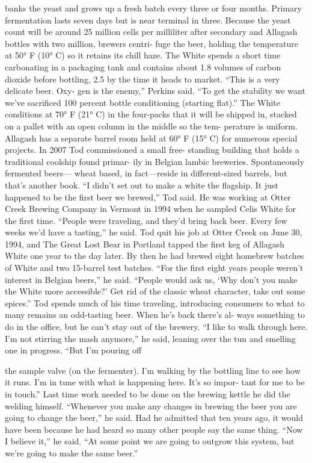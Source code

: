 \documentclass[a4paper,parskip=half]{scrartcl}
\begin{document}
banks the yeast and grows up a fresh batch every three or four months.
Primary fermentation lasts seven days but is near terminal in three.
Because the yeast count will be around 25 million cells per milliliter
after secondary and Allagash bottles with two million, brewers centri-
fuge the beer, holding the temperature at 50° F (10° C) so it retains its
chill haze.
The White spends a short time carbonating in a packaging tank
and contains about 1.8 volumes of carbon dioxide before bottling,
2.5 by the time it heads to market. “This is a very delicate beer. Oxy-
gen is the enemy,” Perkins said. “To get the stability we want we’ve
sacrificed 100 percent bottle conditioning (starting flat).” The White
conditions at 70° F (21° C) in the four-packs that it will be shipped
in, stacked on a pallet with an open column in the middle so the tem-
perature is uniform.
Allagash has a separate barrel room held at 60° F (15° C) for
numerous special projects. In 2007 Tod commissioned a small free-
standing building that holds a traditional coolship found primar-
ily in Belgian lambic breweries. Spontaneously fermented beers—
wheat based, in fact—reside in different-sized barrels, but that’s
another book.
“I didn’t set out to make a white the flagship. It just happened
to be the first beer we brewed,” Tod said. He was working at Otter
Creek Brewing Company in Vermont in 1994 when he sampled Celis
White for the first time. “People were traveling, and they’d bring
back beer. Every few weeks we’d have a tasting,” he said. Tod quit
his job at Otter Creek on June 30, 1994, and The Great Lost Bear in
Portland tapped the first keg of Allagash White one year to the day
later. By then he had brewed eight homebrew batches of White and
two 15-barrel test batches.
“For the first eight years people weren’t interest in Belgian beers,”
he said. “People would ask us, ‘Why don’t you make the White more
accessible?’ Get rid of the classic wheat character, take out some spices.”
Tod spends much of his time traveling, introducing consumers to
what to many remains an odd-tasting beer. When he’s back there’s al-
ways something to do in the office, but he can’t stay out of the brewery.
“I like to walk through here. I’m not stirring the mash anymore,” he said,
leaning over the tun and smelling one in progress. “But I’m pouring off

\parencite[59]{Hieronymus2010}

the sample valve (on the fermenter). I’m walking by the bottling line to
see how it runs. I’m in tune with what is happening here. It’s so impor-
tant for me to be in touch.”
Last time work needed to be done on the brewing kettle he did the
welding himself. “Whenever you make any changes in brewing the beer
you are going to change the beer,” he said.
Had he admitted that ten years ago, it would have been because he
had heard so many other people say the same thing. “Now I believe it,”
he said. “At some point we are going to outgrow this system, but we’re
going to make the same beer.”
\end{document}
